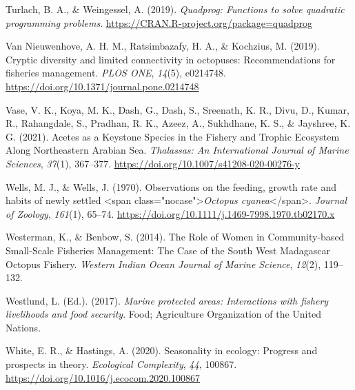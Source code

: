 \documentclass[
]{article}
\newlength{\cslhangindent}
\newlength{\cslentryspacingunit} %
\newenvironment{CSLReferences}[2] %
 {%
  \setlength{\parindent}{0pt}
  \ifodd #1
  \let\oldpar\par
  \def\par{\hangindent=\cslhangindent\oldpar}
  \fi
  \setlength{\parskip}{#2\cslentryspacingunit}
 }%
 {}
\begin{document}
\begin{CSLReferences}{1}{2}
\leavevmode{}%
Turlach, B. A., \& Weingessel, A. (2019). \emph{Quadprog: Functions to solve quadratic programming problems}. \url{https://CRAN.R-project.org/package=quadprog}

\leavevmode{}%
Van Nieuwenhove, A. H. M., Ratsimbazafy, H. A., \& Kochzius, M. (2019). Cryptic diversity and limited connectivity in octopuses: {Recommendations} for fisheries management. \emph{PLOS ONE}, \emph{14}(5), e0214748. \url{https://doi.org/10.1371/journal.pone.0214748}

\leavevmode{}%
Vase, V. K., Koya, M. K., Dash, G., Dash, S., Sreenath, K. R., Divu, D., Kumar, R., Rahangdale, S., Pradhan, R. K., Azeez, A., Sukhdhane, K. S., \& Jayshree, K. G. (2021). Acetes as a {Keystone} {Species} in the {Fishery} and {Trophic} {Ecosystem} {Along} {Northeastern} {Arabian} {Sea}. \emph{Thalassas: An International Journal of Marine Sciences}, \emph{37}(1), 367--377. \url{https://doi.org/10.1007/s41208-020-00276-y}

\leavevmode{}%
Wells, M. J., \& Wells, J. (1970). Observations on the feeding, growth rate and habits of newly settled {\textless{}}span class="nocase"{\textgreater{}}\emph{{Octopus} cyanea}{\textless{}}/span{\textgreater{}}. \emph{Journal of Zoology}, \emph{161}(1), 65--74. \url{https://doi.org/10.1111/j.1469-7998.1970.tb02170.x}

\leavevmode{}%
Westerman, K., \& Benbow, S. (2014). The {Role} of {Women} in {Community}-based {Small}-{Scale} {Fisheries} {Management}: {The} {Case} of the {South} {West} {Madagascar} {Octopus} {Fishery}. \emph{Western Indian Ocean Journal of Marine Science}, \emph{12}(2), 119--132.

\leavevmode{}%
Westlund, L. (Ed.). (2017). \emph{Marine protected areas: Interactions with fishery livelihoods and food security}. Food; Agriculture Organization of the United Nations.

\leavevmode{}%
White, E. R., \& Hastings, A. (2020). Seasonality in ecology: {Progress} and prospects in theory. \emph{Ecological Complexity}, \emph{44}, 100867. \url{https://doi.org/10.1016/j.ecocom.2020.100867}

\end{CSLReferences}
\end{document}
